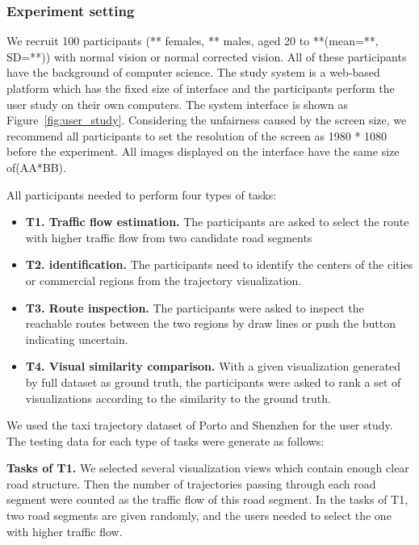 \subsubsection{Experiment setting}

We recruit 100 participants (** females, ** males, aged 20 to **(mean=**, SD=**)) with normal vision or normal corrected vision. All of these participants have the background of computer science.
The study system is a web-based platform which has the fixed size of interface and the participants perform the user study on their own  computers.  The system interface is shown as Figure~\ref{fig:user_study}. Considering the unfairness caused by the screen size, we recommend all participants to set the resolution of the screen as 1980 * 1080 before the experiment. All images displayed on the interface have the same size of(AA*BB).

All participants needed to perform four types of tasks:
\begin{itemize}[noitemsep]
	\item \textbf{T1. Traffic flow estimation.}
	The participants are asked to select the route with higher traffic flow from two candidate road segments
	\item \textbf{T2.  identification.} The participants need to identify the centers of the cities or commercial regions from the trajectory visualization.
	\item \textbf{T3. Route inspection.} The participants were asked to inspect the reachable routes between the two regions by draw lines or push the button indicating uncertain.
	\item \textbf{T4. Visual similarity comparison.} With a given visualization generated by full dataset as ground truth, the participants were asked to rank a set of visualizations according to the similarity to the ground truth.
\end{itemize}

We used the taxi trajectory dataset of Porto and Shenzhen for the user study. The testing data for each type of tasks were generate as follows:

\textbf{Tasks of T1.} We selected several visualization views which contain enough clear road structure. Then the number of trajectories passing through each road segment were counted as the traffic flow of this road segment. In the tasks of T1, two road segments are given randomly, and the users needed to select the one with higher traffic flow.

